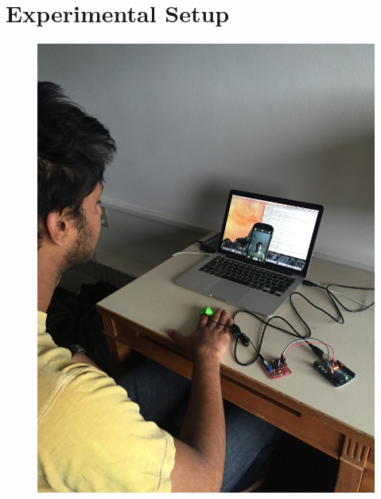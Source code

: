 \documentclass[10pt,twocolumn,letterpaper]{article}
\begin{document}
\section{Experimental Setup}

\begin{figure}
\begin{center}
	\includegraphics[scale=0.045]{figures/setup}

\end{center}
\end{figure}
\end{document}
